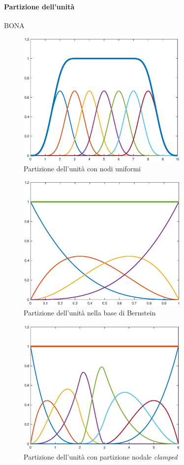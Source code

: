 \documentclass[a4paper, 10pt]{article}
\begin{document}
\paragraph{Partizione dell'unità} BONA
\begin{figure}[]
  \centering
  \includegraphics[width=0.75\textwidth]{figure/unity_std.eps}
  \caption{Partizione dell'unità con nodi uniformi}
  \label{fig:unity_std}
\end{figure} 
\begin{figure}[]
  \centering
  \includegraphics[width=0.75\textwidth]{figure/unity_bernstein.eps}
  \caption{Partizione dell'unità nella base di Bernstein}
  \label{fig:unity_bernstein}
\end{figure} 
\begin{figure}[]
  \centering
  \includegraphics[width=0.75\textwidth]{figure/unity_3.eps}
  \caption{Partizione dell'unità con partizione nodale \textit{clamped}}
  \label{fig:unity_clamped}
\end{figure} 
\end{document}

